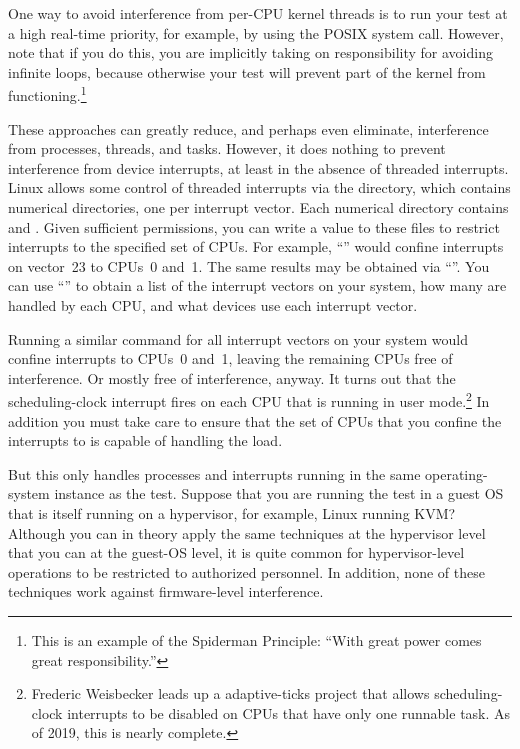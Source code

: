 One way to avoid interference from per-CPU kernel threads is to run
your test at a high real-time priority, for example, by using
the POSIX  system call.
However, note that if you do this, you are implicitly taking on
responsibility for avoiding infinite loops, because otherwise
your test will prevent part of the kernel from functioning.\footnote{
	This is an example of the Spiderman Principle: ``With great
	power comes great responsibility.''}

These approaches can greatly reduce, and perhaps even eliminate,
interference from processes, threads, and tasks.
However, it does nothing to prevent interference from device
interrupts, at least in the absence of threaded interrupts.
Linux allows some control of threaded interrupts via the
 directory, which contains numerical directories, one
per interrupt vector.
Each numerical directory contains  and
.
Given sufficient permissions, you can write a value to these files
to restrict interrupts to the specified set of CPUs.
For example, ``''
would confine interrupts on vector~23 to CPUs~0 and~1.
The same results may be obtained via
``''.
You can use ``'' to obtain a list of the interrupt
vectors on your system, how many are handled by each CPU, and what
devices use each interrupt vector.

Running a similar command for all interrupt vectors on your system
would confine interrupts to CPUs~0 and~1, leaving the remaining CPUs
free of interference.
Or mostly free of interference, anyway.
It turns out that the scheduling-clock interrupt fires on each CPU
that is running in user mode.\footnote{
	Frederic Weisbecker leads up a 
	adaptive-ticks project
	that allows scheduling-clock interrupts to be disabled
	on CPUs that have only one runnable task.
	As of 2019, this is nearly complete.}
In addition you must take care to ensure that the set of CPUs that you
confine the interrupts to is capable of handling the load.

But this only handles processes and interrupts running in the same
operating-system instance as the test.
Suppose that you are running the test in a guest OS that is itself
running on a hypervisor, for example, Linux running KVM?
Although you can in theory apply the same techniques at the hypervisor
level that you can at the guest-OS level, it is quite common for
hypervisor-level operations to be restricted to authorized personnel.
In addition, none of these techniques work against firmware-level
interference.

